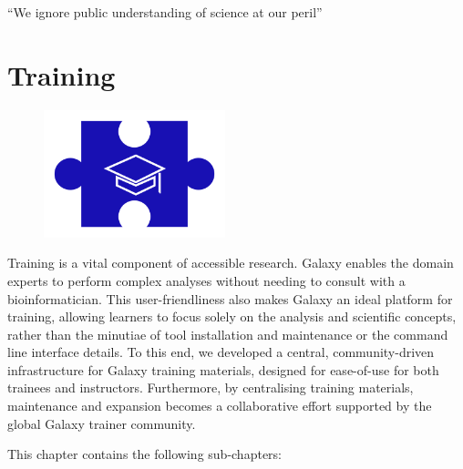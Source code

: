 \cleartorightpage
\begin{savequote}[75mm]
``We ignore public understanding of science at our peril''
\end{savequote}

\chapter{Training}\label{chapter:training}

\begin{figure}[t!]
\includegraphics[height=10em]{frontmatter/images/chapter-header-training.png}
\end{figure}
\setcounter{figure}{-1}
\setcounter{table}{-1}
\setcounter{section}{-1}

Training is a vital component of accessible research. Galaxy enables the domain experts to perform complex analyses without needing to consult with a bioinformatician. This user-friendliness also makes Galaxy an ideal platform for training, allowing learners to focus solely on the analysis and scientific concepts, rather than the minutiae of tool installation and maintenance or the command line interface details. To this end, we developed a central, community-driven infrastructure for Galaxy training materials, designed for ease-of-use for both trainees and instructors. Furthermore, by centralising training materials, maintenance and expansion becomes a collaborative effort supported by the global Galaxy trainer community.

This chapter contains the following sub-chapters:

